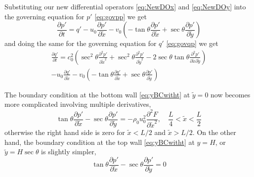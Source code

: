 \documentclass[11pt]{article}
\begin{document}
Substituting our new differential operators \eqref{eq:NewDOx} and \eqref{eq:NewDOy} into the governing equation for $p'$ \eqref{eq:govpp} we get
\begin{equation} \label{eq:govppTilde}
\frac{\partial p'}{\partial t} = q' - u_0 \frac{\partial p'}{\partial \tilde{x}} - v_0 \left( -\tan\theta \frac{\partial p'}{\partial \tilde{x}} + \sec\theta  \frac{\partial p'}{\partial \tilde{y}} \right)
\end{equation}
and doing the same for the governing equation for $q'$ \eqref{eq:govqp} we get
\begin{multline} \label{eq:govqpTilde}
\frac{\partial q'}{\partial t} =
  c_0^2 \left( \sec^2\theta \frac{\partial^2 p'}{\partial \tilde{x}^2} + \sec^2\theta \frac{\partial^2 p'}{\partial \tilde{y}^2} - 2\sec\theta\tan\theta \frac{\partial^2 p'}{\partial\tilde{x} \partial\tilde{y}} \right) \\
  - u_0 \frac{\partial q'}{\partial \tilde{x}}
  - v_0 \left( -\tan\theta \frac{\partial q'}{\partial \tilde{x}} + \sec\theta \frac{\partial p'}{\partial \tilde{y}} \right)
\end{multline}

The boundary condition at the bottom wall \eqref{eq:yBCwitht} at $\tilde{y}=0$ now becomes more complicated involving multiple derivatives,
\begin{equation} \label{eq:y0BCoblique}
\tan\theta \frac{\partial p'}{\partial \tilde{x}} - \sec\theta \frac{\partial p'}{\partial \tilde{y}} = -\rho_0 u_0^2 \frac{\partial^2F}{\partial \tilde{x}^2}, \quad \frac{L}{4} < \tilde{x} < \frac{L}{2}
\end{equation}
otherwise the right hand side is zero for $\tilde{x} < L/2$ and $\tilde{x} > L/2$. On the other hand, the boundary condition at the top wall \eqref{eq:yBCwitht} at $y=H$, or $\tilde{y}=H\sec\theta$ is slightly simpler,
\begin{equation} \label{eq:yHoblique}
  \tan\theta \frac{\partial p'}{\partial \tilde{x}} - \sec\theta \frac{\partial p'}{\partial \tilde{y}} = 0
\end{equation}
\end{document}
